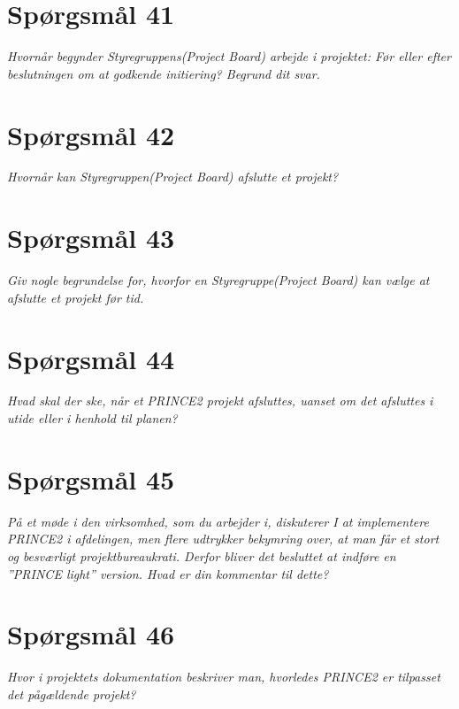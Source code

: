 \section{Spørgsmål 41}
\textit{Hvornår begynder Styregruppens(Project Board) arbejde i projektet: Før eller efter beslutningen om at godkende initiering? Begrund dit svar.}

\section{Spørgsmål 42}
\textit{Hvornår kan Styregruppen(Project Board) afslutte et projekt?}

\section{Spørgsmål 43}
\textit{Giv nogle begrundelse for, hvorfor en Styregruppe(Project Board) kan vælge at afslutte et projekt før tid.}

\section{Spørgsmål 44}
\textit{Hvad skal der ske, når et PRINCE2 projekt afsluttes, uanset om det afsluttes i utide eller i henhold til planen?}

\section{Spørgsmål 45}
\textit{På et møde i den virksomhed, som du arbejder i, diskuterer I at implementere PRINCE2 i afdelingen, men flere udtrykker bekymring over, at man får et stort og besværligt projektbureaukrati. Derfor bliver det besluttet at indføre en ”PRINCE light” version. Hvad er din kommentar til dette?}

\section{Spørgsmål 46}
\textit{Hvor i projektets dokumentation beskriver man, hvorledes PRINCE2 er tilpasset det pågældende projekt?}
